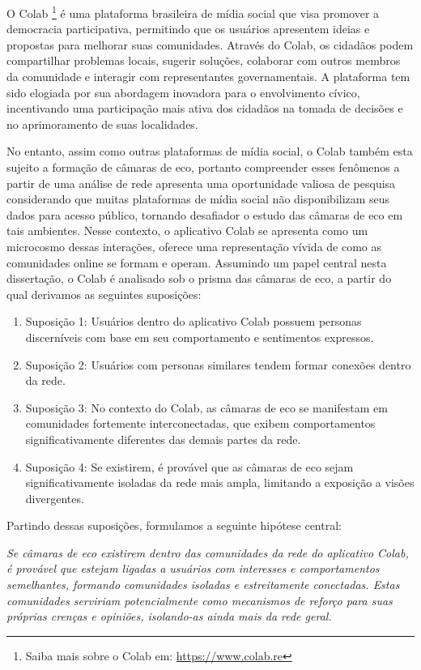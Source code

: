 O Colab \footnote{Saiba mais sobre o Colab em: \url{https://www.colab.re}} é uma plataforma brasileira de mídia social que visa promover a democracia participativa, permitindo que os usuários apresentem ideias e propostas para melhorar suas comunidades. Através do Colab, os cidadãos podem compartilhar problemas locais, sugerir soluções, colaborar com outros membros da comunidade e interagir com representantes governamentais. A plataforma tem sido elogiada por sua abordagem inovadora para o envolvimento cívico, incentivando uma participação mais ativa dos cidadãos na tomada de decisões e no aprimoramento de suas localidades. 

No entanto, assim como outras plataformas de mídia social, o Colab também esta sujeito a formação de câmaras de eco, portanto compreender esses fenômenos a partir de uma análise de rede apresenta uma oportunidade valiosa de pesquisa considerando que muitas plataformas de mídia social não disponibilizam seus dados para acesso público, tornando desafiador o estudo das câmaras de eco em tais ambientes. Nesse contexto, o aplicativo Colab se apresenta como um microcosmo dessas interações, oferece uma representação vívida de como as comunidades online se formam e operam. Assumindo um papel central nesta dissertação, o Colab é analisado sob o prisma das câmaras de eco, a partir do qual derivamos as seguintes suposições:

\begin{enumerate}
	\item Suposição 1: Usuários dentro do aplicativo Colab possuem personas discerníveis com base em seu comportamento e sentimentos expressos.
	\item Suposição 2: Usuários com personas similares tendem formar conexões dentro da rede.
	\item Suposição 3: No contexto do Colab, as câmaras de eco se manifestam em comunidades fortemente interconectadas, que exibem comportamentos significativamente diferentes das demais partes da rede.
	\item Suposição 4: Se existirem, é provável que as câmaras de eco sejam significativamente isoladas da rede mais ampla, limitando a exposição a visões divergentes.
\end{enumerate}

Partindo dessas suposições, formulamos a seguinte hipótese central:

\textit{
	Se câmaras de eco existirem dentro das comunidades da rede do aplicativo Colab, é provável que estejam ligadas a usuários com interesses e comportamentos semelhantes, formando comunidades isoladas e estreitamente conectadas. Estas comunidades serviriam potencialmente como mecanismos de reforço para suas próprias crenças e opiniões, isolando-as ainda mais da rede geral.
}

